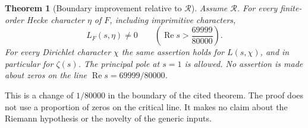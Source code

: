 \documentclass[11pt,a4paper]{article}
\newtheorem{theorem}{Theorem}[section]
\theoremstyle{definition}
\newcommand{\Rea}{\operatorname{Re}}
\begin{document}
\begin{theorem}[Boundary improvement relative to $\mathcal R$]
\label{thm:main}
Assume $\mathcal R$. For every finite-order Hecke character $\eta$ of
$F$, including imprimitive characters,
\[
 L_F(s,\eta)\ne0\qquad\left(\Rea s>\frac{69999}{80000}\right).
\]
For every Dirichlet character $\chi$ the same assertion holds for
$L(s,\chi)$, and in particular for $\zeta(s)$. The principal pole
at $s=1$ is allowed. No assertion is made about zeros on the line
$\Rea s=69999/80000$.
\end{theorem}

This is a change of $1/80000$ in the boundary of the cited theorem.
The proof does not use a proportion of zeros on the critical line.
It makes no claim about the Riemann hypothesis or the novelty of the
generic inputs.
\end{document}
